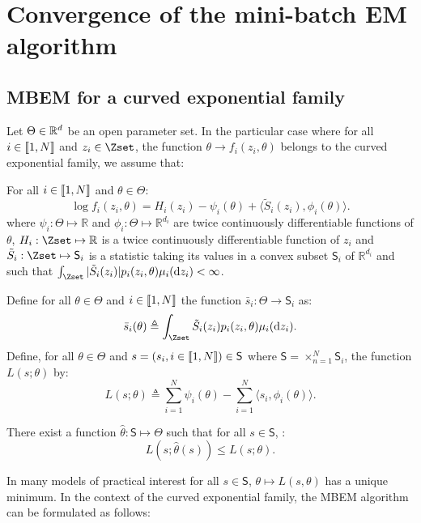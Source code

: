 \section{Convergence of the mini-batch EM algorithm}\label{sec:mbem}

\subsection{MBEM for a curved exponential family} \label{sssec:expo}
Let $\Theta \in \mathbb{R}^d$ be  an open parameter set. In the particular case where for all $i \in \llbracket1,N\rrbracket$ and $z_i \in \Zset$, the function $\theta \to f_i(z_i,\theta)$ belongs to the curved exponential family, we assume that:
\begin{assumption_expo}
For all $i \in \llbracket1,N\rrbracket$ and $\theta \in \Theta$:
\begin{equation}
\log f_i(z_i,\theta) = H_i(z_i) -\psi_i(\theta) + \langle \tilde{S}_i(z_i), \phi_i(\theta)\rangle.
\end{equation}
where $\psi_i: \Theta \mapsto \mathbb{R}$ and $\phi_i: \Theta \mapsto \mathbb{R}^{d_i}$ are twice continuously differentiable functions of $\theta$, $H_i: \Zset \mapsto \mathbb{R}$ is a twice continuously differentiable function of $z_i$ and $\tilde{S}_i: \Zset \mapsto \mathsf{S}_i$ is a statistic taking its values in a convex subset $\mathsf{S}_i$ of $\mathbb{R}^{d_i}$ and such that $\int_{\Zset}{|\tilde{S}_i(z_i)|p_i(z_i,\theta) \mu_i(\dz_i)} < \infty$.
\end{assumption_expo}
\noindent Define for all $\theta \in \Theta$ and $i \in \llbracket1,N\rrbracket$ the function $\bar{s}_i: \Theta \to \mathsf{S}_i$ as:
\begin{equation}
\bar{s}_i(\theta) \triangleq \int_{\Zset}{\tilde{S}_i(z_i)p_i(z_i,\theta) \mu_i(\dz_i)}.
\end{equation}
Define, for all $\theta \in \Theta$ and $s = (s_i, i \in \llbracket1,N\rrbracket) \in \mathsf{S}$ where $\mathsf{S} = \times_{n=1}^N \mathsf{S}_i$, the function $L(s; \theta)$ by:
\begin{equation}\label{curvedL}
L(s;\theta) \triangleq \sum_{i=1}^N{\psi_i(\theta)} - \sum_{i=1}^N{\langle s_i, \phi_i(\theta)\rangle}.
\end{equation}
\begin{assumption_expo}
There exist a function $\hat{\theta}: \mathsf{S} \mapsto \Theta$ such that for all $s \in \mathsf{S}$, :
\begin{equation}\label{max_suff}
L(s;\hat{\theta}(s))\leq L(s;\theta).
\end{equation}
\end{assumption_expo}
In many models of practical interest for all $s \in \mathsf{S}$, $\theta \mapsto L(s,\theta)$ has a unique minimum. In the context of the curved exponential family, the MBEM algorithm can be formulated as follows:

